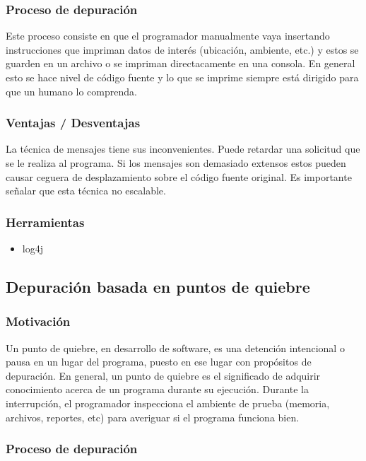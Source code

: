 \documentclass[12pt,legalpaper]{report}
\begin{document}
			\subsubsection{Proceso de depuración}

Este proceso consiste en que el programador manualmente vaya insertando instrucciones que impriman datos de interés (ubicación, ambiente, etc.) y estos se guarden en un archivo o se impriman directacamente en una consola.  En general esto se hace nivel de código fuente y lo que se imprime siempre está dirigido para que un humano lo comprenda.

			\subsubsection{Ventajas / Desventajas}

La técnica de mensajes tiene sus inconvenientes. Puede retardar una solicitud que se le realiza al programa. Si los mensajes son demasiado extensos estos pueden causar ceguera de desplazamiento sobre el código fuente original.  Es importante señalar que esta técnica no escalable.  


			\subsubsection{Herramientas}
\begin{itemize}
	\item log4j
\end{itemize}

		\subsection{Depuración basada en puntos de quiebre}
			\subsubsection{Motivación}

Un punto de quiebre, en desarrollo de software, es una detención intencional o pausa en un lugar del programa, puesto en ese lugar con propósitos de depuración.  En general, un punto de quiebre es el significado de adquirir conocimiento acerca de un programa durante su ejecución.  Durante la interrupción, el programador inspecciona el ambiente de prueba (memoria, archivos, reportes, etc) para averiguar si el programa funciona bien.

			\subsubsection{Proceso de depuración}
\end{document}
